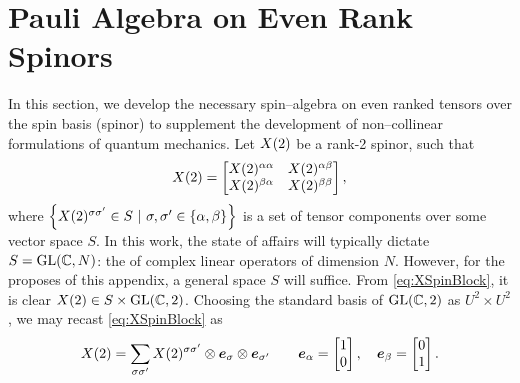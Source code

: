 \chapter{Pauli Algebra on Even Rank Spinors}
\label{apx:SpinorOp}

In this section, we develop the necessary spin--algebra on even ranked tensors over the spin basis (spinor) to supplement the development 
of non--collinear formulations of quantum mechanics.
Let $\spinor{2}{X}$ be a rank-2 spinor, such that
\begin{equation}
\label{eq:XSpinBlock}
\spinor{2}{X} = 
  \begin{bmatrix}
    \spinor{2}{X}^{\alpha\alpha} & \spinor{2}{X}^{\alpha\beta} \\
    \spinor{2}{X}^{\beta\alpha}  & \spinor{2}{X}^{\beta\beta} \\
  \end{bmatrix}, 
\end{equation}
where $\left\lbrace\spinor{2}{X}^{\sigma\sigma'} \in S
\text{ }\vert\text{ } \sigma,\sigma' \in \{\alpha,\beta\} \right\rbrace$ is a
set of tensor components over some vector space $S$. In this work, the state of affairs will
typically dictate $S = \GL{C}{N}$: the  of complex linear operators of dimension $N$. However, 
for the proposes of this appendix, a general space $S$ will suffice. From \cref{eq:XSpinBlock}, 
it is clear $\spinor{2}{X} \in S \times \GL{C}{2}$.
Choosing the standard basis of $\GL{C}{2}$ as $U^2 \times U^2$,
we may recast \cref{eq:XSpinBlock} as
\begin{equation}
\label{eq:XSpinComp}
  \spinor{2}{X} = \sum_{\sigma\sigma'} \spinor{2}{X}^{\sigma\sigma'} \otimes \vc{e}_\sigma \otimes \vc{e}_{\sigma'} 
  \qquad 
  \vc{e}_\alpha = \begin{bmatrix} 1 \\ 0 \end{bmatrix}, \quad 
  \vc{e}_\beta  = \begin{bmatrix} 0 \\ 1 \end{bmatrix}.
\end{equation}

